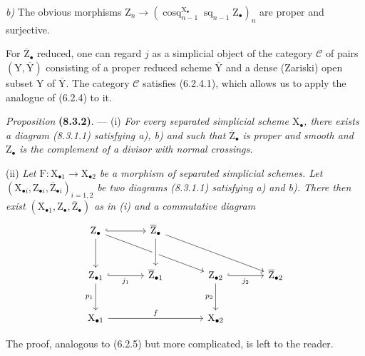 \documentclass[11pt,leqno]{article}
\begin{document}
\textit{b)} The obvious morphisms \(\mathrm{Z}_n\to(\operatorname{cosq}_{n-1}^{\mathrm{X}_\bullet}\operatorname{sq}_{n-1}\mathrm{Z}_\bullet)_n\) are proper and surjective.

For \(\overline{\mathrm{Z}}_\bullet\) reduced, one can regard \(j\) as a simplicial object of the category \(\mathcal{C}\) of pairs \((\mathrm{Y},\overline{\mathrm{Y}})\) consisting of a proper reduced scheme \(\overline{\mathrm{Y}}\) and a dense (Zariski) open subset \(\mathrm{Y}\) of \(\overline{\mathrm{Y}}\). The category \(\mathcal{C}\) satisfies (6.2.4.1), which allows us to apply the analogue of (6.2.4) to it.

\textit{Proposition} \textbf{(8.3.2)}. — (i) \textit{For every separated simplicial scheme \(\mathrm{X}_\bullet\), there exists a diagram \textup{(8.3.1.1)} satisfying a), b) and such that \(\overline{\mathrm{Z}}_\bullet\) is proper and smooth and \(\mathrm{Z}_\bullet\) is the complement of a divisor with normal crossings.}

(ii) \textit{Let \(\mathrm{F}:\mathrm{X}_{\bullet1}\to\mathrm{X}_{\bullet2}\) be a morphism of separated simplicial schemes. Let \((\mathrm{X}_{\bullet i},\mathrm{Z}_{\bullet i},\overline{\mathrm{Z}}_{\bullet i})_{i=1,2}\) be two diagrams \textup{(8.3.1.1)} satisfying a) and b). There then exist \((\mathrm{X}_{\bullet1},\mathrm{Z}_\bullet,\overline{\mathrm{Z}}_\bullet)\) as in \textup{(i)} and a commutative diagram}
\[
\begin{tikzcd}[column sep=large,row sep=large]
\mathrm{Z}_\bullet
  \arrow[r,hook] \arrow[d] \arrow[drr]
 & \overline{\mathrm{Z}}_\bullet
   \arrow[d,crossing over] \arrow[drr]
 & &\\
\mathrm{Z}_{\bullet1}
  \arrow[r,hook,"j_1"'] \arrow[d,"p_1"']
 & \overline{\mathrm{Z}}_{\bullet1}
 & \mathrm{Z}_{\bullet2}
   \arrow[r,hook,"j_2"'] \arrow[d,"p_2"']
 & \overline{\mathrm{Z}}_{\bullet2}\\
\mathrm{X}_{\bullet1} \arrow[rr,"f"]
 & & \mathrm{X}_{\bullet2} &
\end{tikzcd}
\]

The proof, analogous to (6.2.5) but more complicated, is left to the reader.
\end{document}
